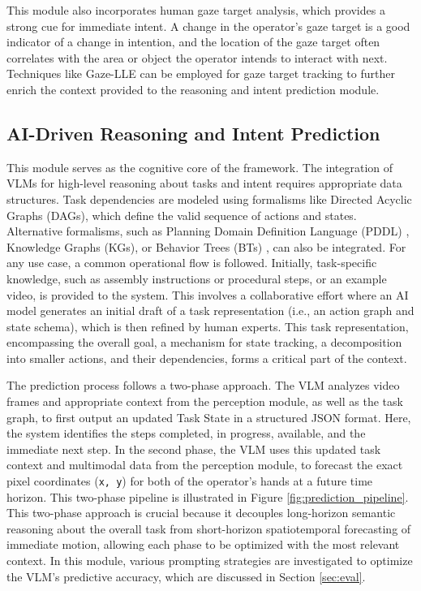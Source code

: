 \documentclass[biomimetics,article,submit,pdftex,moreauthors]{Definitions/mdpi}
\begin{document}
This module also incorporates human gaze target analysis, which provides a strong cue for immediate intent. A change in the operator's gaze target is a good indicator of a change in intention, and the location of the gaze target often correlates with the area or object the operator intends to interact with next. Techniques like Gaze-LLE \citep{ryan2024gazelle} can be employed for gaze target tracking to further enrich the context provided to the reasoning and intent prediction module.


\subsection{AI-Driven Reasoning and Intent Prediction}
This module serves as the cognitive core of the framework. The integration of VLMs for high-level reasoning about tasks and intent requires appropriate data structures. Task dependencies are modeled using formalisms like Directed Acyclic Graphs (DAGs), which define the valid sequence of actions and states. Alternative formalisms, such as Planning Domain Definition Language (PDDL) \citep{Singh2023}, Knowledge Graphs (KGs), or Behavior Trees (BTs) \citep{Ahn2022, IEEE-Knowledgebased2021}, can also be integrated. For any use case, a common operational flow is followed. Initially, task-specific knowledge, such as assembly instructions or procedural steps, or an example video, is provided to the system. This involves a collaborative effort where an AI model generates an initial draft of a task representation (i.e., an action graph and state schema), which is then refined by human experts. This task representation, encompassing the overall goal, a mechanism for state tracking, a decomposition into smaller actions, and their dependencies, forms a critical part of the context.

The prediction process follows a two-phase approach. The VLM analyzes video frames and appropriate context from the perception module, as well as the task graph, to first output an updated Task State in a structured JSON format. Here, the system identifies the steps completed, in progress, available, and the immediate next step. In the second phase, the VLM uses this updated task context and multimodal data from the perception module, to forecast the exact pixel coordinates (\texttt{x, y}) for both of the operator's hands at a future time horizon. This two-phase pipeline is illustrated in Figure \ref{fig:prediction_pipeline}. This two-phase approach is crucial because it decouples long-horizon semantic reasoning about the overall task from short-horizon spatiotemporal forecasting of immediate motion, allowing each phase to be optimized with the most relevant context. In this module, various prompting strategies are investigated to optimize the VLM's predictive accuracy, which are discussed in Section \ref{sec:eval}.
\end{document}
